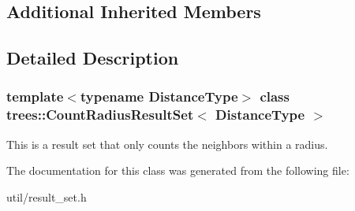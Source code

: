 \subsection*{Additional Inherited Members}


\subsection{Detailed Description}
\subsubsection*{template$<$typename Distance\+Type$>$\newline
class trees\+::\+Count\+Radius\+Result\+Set$<$ Distance\+Type $>$}

This is a result set that only counts the neighbors within a radius. 

The documentation for this class was generated from the following file\+:\begin{DoxyCompactItemize}
\item 
util/result\+\_\+set.\+h\end{DoxyCompactItemize}
